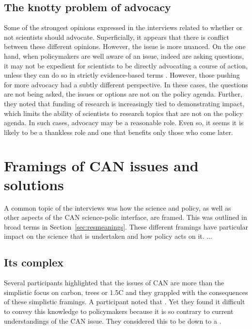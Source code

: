 \subsection{The knotty problem of advocacy}\label{sec:disadvocacy}
Some of the strongest opinions expressed in the interviews related to whether or not scientists should advocate. Superficially, it appears that there is conflict between these different opinions. However, the issue is more nuanced. On the one hand, when policymakers are well aware of an issue, indeed are asking questions, it may not be expedient for scientists to be directly advocating a course of action, unless they can do so in strictly evidence-based terms %
. However, those pushing for more advocacy had a subtly different perspective. In these cases, the questions are not being asked, the issues or options are not on the policy agenda. Further, they noted that funding of research is increasingly tied to demonstrating impact, which limits the ability of scientists to research topics that are not on the policy agenda. In such cases, advocacy may be a reasonable role. Even so, it seems it is likely to be a thankless role and one that benefits only those who come later. 

\section{Framings of CAN issues and solutions}
A common topic of the interviews was how the science and policy, as well as other aspects of the CAN science-polic interface, are framed. This was outlined in broad terms in Section~\ref{sec:resmeanings}. These different framings have particular impact on the science that is undertaken and how policy acts on it. ...

\subsection{Its complex}
Several participants highlighted that the issues of CAN are more than the simplistic focus on carbon, trees or 1.5\degree C and they grappled with the consequences of these simplistic framings. A participant noted that . Yet they found it difficult to convey this knowledge to policymakers because it is so contrary to current understandings of the CAN issue. They considered this to be down to a . 

